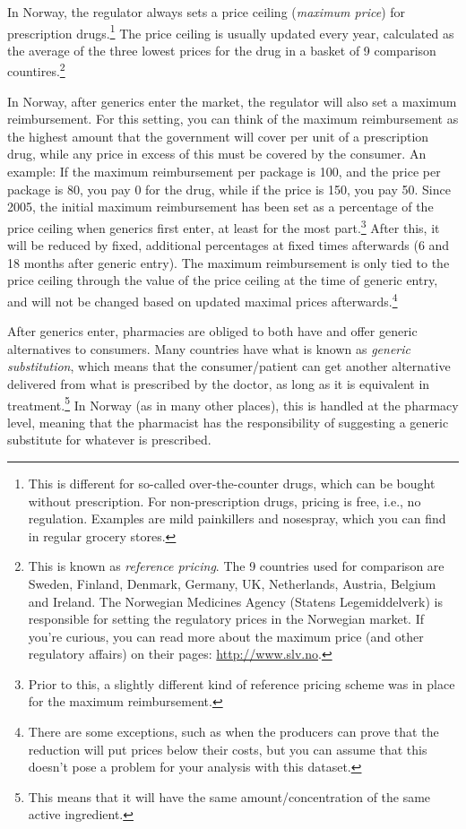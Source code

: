 \documentclass[12pt,a4paper]{article}
\begin{document}
In Norway, the regulator always sets a price ceiling (\emph{maximum price}) for prescription drugs.\footnote{This is different for so-called over-the-counter drugs, which can be bought without prescription. For non-prescription drugs, pricing is free, i.e., no regulation. Examples are mild painkillers and nosespray, which you can find in regular grocery stores.} The price ceiling is usually updated every year, calculated as the average of the three lowest prices for the drug in a basket of 9 comparison countires.\footnote{This is known as \emph{reference pricing}. The 9 countries used for comparison are Sweden, Finland, Denmark, Germany, UK, Netherlands, Austria, Belgium and Ireland. The Norwegian Medicines Agency (Statens Legemiddelverk) is responsible for setting the regulatory prices in the Norwegian market. If you're curious, you can read more about the maximum price (and other regulatory affairs) on their pages: \url{http://www.slv.no}.}

In Norway, after generics enter the market, the regulator will also set a maximum reimbursement. For this setting, you can think of the maximum reimbursement as the highest amount that the government will cover per unit of a prescription drug, while any price in excess of this must be covered by the consumer. An example: If the maximum reimbursement per package is 100, and the price per package is 80, you pay 0 for the drug, while if the price is 150, you pay 50. Since 2005, the initial maximum reimbursement has been set as a percentage of the price ceiling when generics first enter, at least for the most part.\footnote{Prior to this, a slightly different kind of reference pricing scheme was in place for the maximum reimbursement.} After this, it will be reduced by fixed, additional percentages at fixed times afterwards (6 and 18 months after generic entry). The maximum reimbursement is only tied to the price ceiling through the value of the price ceiling at the time of generic entry, and will not be changed based on updated maximal prices afterwards.\footnote{There are some exceptions, such as when the producers can prove that the reduction will put prices below their costs, but you can assume that this doesn't pose a problem for your analysis with this dataset.}

After generics enter, pharmacies are obliged to both have and offer generic alternatives to consumers. Many countries have what is known as \emph{generic substitution}, which means that the consumer/patient can get another alternative delivered from what is prescribed by the doctor, as long as it is equivalent in treatment.\footnote{This means that it will have the same amount/concentration of the same active ingredient.} In Norway (as in many other places), this is handled at the pharmacy level, meaning that the pharmacist has the responsibility of suggesting a generic substitute for whatever is prescribed.
\end{document}
